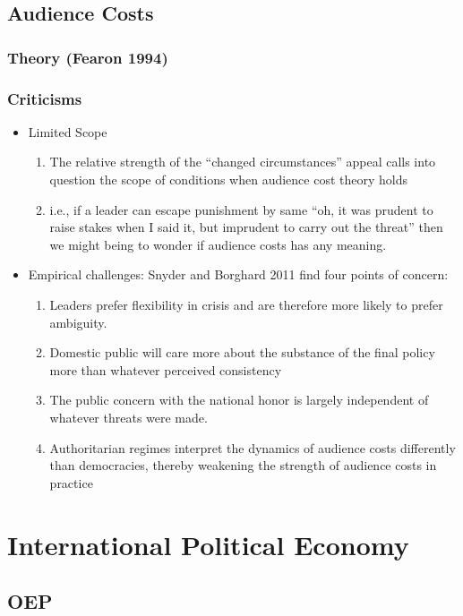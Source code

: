 \documentclass[11pt]{article}
\begin{document}
\subsection{Audience Costs}
\label{sec-1-7}
\subsubsection{Theory (Fearon 1994)}
\label{sec-1-7-1}
\subsubsection{Criticisms}
\label{sec-1-7-2}
\begin{itemize}
\item Limited Scope
\label{sec-1-7-2-1}
\begin{enumerate}
\item The relative strength of the ``changed circumstances'' appeal calls
into question the scope of conditions when audience cost theory holds
\item i.e., if a leader can escape punishment by same ``oh, it was prudent
to raise stakes when I said it, but imprudent to carry out the
threat'' then we might being to wonder if audience costs has any
meaning.
\end{enumerate}
\item Empirical challenges:
\label{sec-1-7-2-2}
Snyder and Borghard 2011 find four points of concern: 

\begin{enumerate}
\item Leaders prefer flexibility in crisis and are therefore more likely
to prefer ambiguity.
\item Domestic public will care more about the substance of the final
policy more than whatever perceived consistency
\item The public concern with the national honor is largely independent
of whatever threats were made.
\item Authoritarian regimes interpret the dynamics of audience costs
differently than democracies, thereby weakening the strength of
audience costs in practice
\end{enumerate}
\end{itemize}

\section{International Political Economy}
\label{sec-2}
\subsection{OEP}
\label{sec-2-1}
\end{document}
